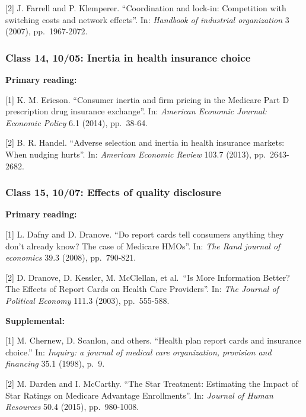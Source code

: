 \documentclass[11pt,]{article}
\begin{document}
{[}2{]} J. Farrell and P. Klemperer. ``Coordination and lock-in:
Competition with switching costs and network effects''. In:
\emph{Handbook of industrial organization} 3 (2007), pp.~1967-2072.

\hypertarget{class-14-1005-inertia-in-health-insurance-choice}{%
\subsubsection{Class 14, 10/05: Inertia in health insurance
choice}\label{class-14-1005-inertia-in-health-insurance-choice}}

\textbf{Primary reading:}

{[}1{]} K. M. Ericson. ``Consumer inertia and firm pricing in the
Medicare Part D prescription drug insurance exchange''. In:
\emph{American Economic Journal: Economic Policy} 6.1 (2014), pp.~38-64.

{[}2{]} B. R. Handel. ``Adverse selection and inertia in health
insurance markets: When nudging hurts''. In: \emph{American Economic
Review} 103.7 (2013), pp.~2643-2682.

\hypertarget{class-15-1007-effects-of-quality-disclosure}{%
\subsubsection{Class 15, 10/07: Effects of quality
disclosure}\label{class-15-1007-effects-of-quality-disclosure}}

\textbf{Primary reading:}

{[}1{]} L. Dafny and D. Dranove. ``Do report cards tell consumers
anything they don't already know? The case of Medicare HMOs''. In:
\emph{The Rand journal of economics} 39.3 (2008), pp.~790-821.

{[}2{]} D. Dranove, D. Kessler, M. McClellan, et al.~``Is More
Information Better? The Effects of Report Cards on Health Care
Providers''. In: \emph{The Journal of Political Economy} 111.3 (2003),
pp.~555-588.

\textbf{Supplemental:}

{[}1{]} M. Chernew, D. Scanlon, and others. ``Health plan report cards
and insurance choice.'' In: \emph{Inquiry: a journal of medical care
organization, provision and financing} 35.1 (1998), p.~9.

{[}2{]} M. Darden and I. McCarthy. ``The Star Treatment: Estimating the
Impact of Star Ratings on Medicare Advantage Enrollments''. In:
\emph{Journal of Human Resources} 50.4 (2015), pp.~980-1008.
\end{document}
